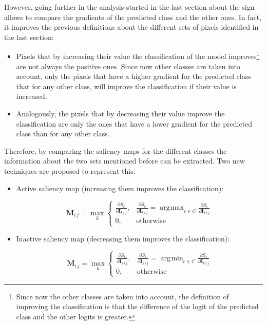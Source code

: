 \documentclass[preprint,12pt]{elsarticle}
\DeclareMathOperator*{\argmax}{arg\!max}
\DeclareMathOperator*{\argmin}{arg\!min}
\begin{document}
However, going further in the analysis started in the last section about the sign allows to compare the gradients of the predicted class and the other ones. In fact, it improves the previous definitions about the different sets of pixels identified in the last section:

\begin{itemize}
    \item Pixels that by increasing their value the classification of the model improves\footnote{Since now the other classes are taken into account, the definition of improving the classification is that the difference of the logit of the predicted class and the other logits is greater.} are not always the positive ones. Since now other classes are taken into account, only the pixels that have a higher gradient for the predicted class that for any other class, will improve the classification if their value is increased.
    \item Analogously, the pixels that by decreasing their value improve the classification are only the ones that have a lower gradient for the predicted class than for any other class.
\end{itemize}

Therefore, by comparing the saliency maps for the different classes the information about the two sets mentioned before can be extracted. Two new techniques are proposed to represent this:

\begin{itemize}
    \item Active saliency map (increasing them improves the classification):
    
    \begin{equation}
      \boldsymbol{M}_{i\, j} = \max_{k}
        \begin{cases}
            \frac{\partial S_{\hat{c}}}{\partial \boldsymbol{I}_{k\, i\, j}}, & \frac{\partial S_{\hat{c}}}{\partial \boldsymbol{I}_{k\, i\, j}} = \argmax_{c \in C}\frac{\partial S_{c}}{\partial \boldsymbol{I}_{k\, i\, j}} \\
            0, & \text{otherwise}
        \end{cases}
        \label{eq: active saliency map}
    \end{equation}

    \item Inactive saliency map (decreasing them improves the classification):
    
    \begin{equation}
      \boldsymbol{M}_{i\, j} = \max_{k}
        \begin{cases}
            \frac{\partial S_{\hat{c}}}{\partial \boldsymbol{I}_{k\, i\, j}}, & \frac{\partial S_{\hat{c}}}{\partial \boldsymbol{I}_{k\, i\, j}} = \argmin_{c \in C}\frac{\partial S_{c}}{\partial \boldsymbol{I}_{k\, i\, j}} \\
            0, & \text{otherwise}
        \end{cases}
        \label{eq: inactive saliency map}
    \end{equation}

\end{itemize}
\end{document}
